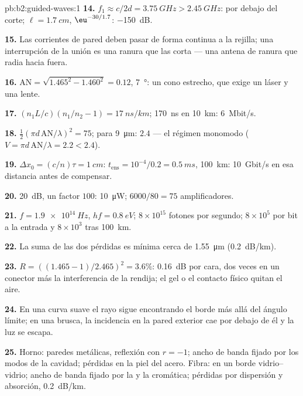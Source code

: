 \begin{solution}{pb:b2:guided-waves:1}
\textbf{14.} $f_1 \approx c/2d = \qty{3.75}{GHz} > \qty{2.45}{GHz}$: por debajo del corte; $\ell =
\qty{1.7}{cm}$, $\eu^{-30/1.7}$: \qty{-150}{dB}.

\textbf{15.} Las corrientes de pared deben pasar de forma continua a la rejilla;
una interrupción de la unión es una ranura que las corta --- una antena de
ranura que radia hacia fuera.

\textbf{16.} $\mathrm{AN} = \sqrt{1.465^2 - 1.460^2} = 0.12$, \qty{7}{\degree}: un cono
estrecho, que exige un láser y una lente.

\textbf{17.} $(n_1L/c)(n_1/n_2 - 1) = \qty{17}{ns/km}$; \qty{170}{ns} en \qty{10}{km}:
\qty{6}{Mbit/s}.

\textbf{18.} $\tfrac12(\pi d\,\mathrm{AN}/\lambda)^2 = 75$; para \qty{9}{\micro m}: $2.4$ --- el
régimen monomodo ($V = \pi d\,\mathrm{AN}/\lambda = 2.2 < 2.4$).

\textbf{19.} $\Delta x_0 = (c/n)\tau = \qty{1}{cm}$: $t_{\text{ens}} = 10^{-4}/0.2 = \qty{0.5}{ms}$,
\qty{100}{km}: \qty{10}{Gbit/s} en esa distancia antes de compensar.

\textbf{20.} \qty{20}{dB}, un factor $100$: \qty{10}{\micro W}; $6000/80 = 75$
amplificadores.

\textbf{21.} $f = \qty{1.9e14}{Hz}$, $hf = \qty{0.8}{eV}$; $8 \times 10^{15}$ fotones por
segundo; $8 \times 10^5$ por bit a la entrada y $8 \times 10^3$ tras \qty{100}{km}.

\textbf{22.} La suma de las dos pérdidas es mínima cerca de \qty{1.55}{\micro m}
(\qty{0.2}{dB/km}).

\textbf{23.} $R = ((1.465 - 1)/2.465)^2 = 3.6\%$: \qty{0.16}{dB} por cara, dos veces
en un conector más la interferencia de la rendija; el gel o el contacto físico
quitan el aire.

\textbf{24.} En una curva suave el rayo sigue encontrando el borde más allá
del ángulo límite; en una brusca, la incidencia en la pared exterior
cae por debajo de él y la luz se escapa.

\textbf{25.} Horno: paredes metálicas, reflexión con $r = -1$; ancho de banda fijado
por los modos de la cavidad; pérdidas en la piel del acero. Fibra:  en un borde vidrio--vidrio; ancho de banda fijado por la  y
la cromática; pérdidas por dispersión y absorción, \qty{0.2}{dB/km}.
\end{solution}
